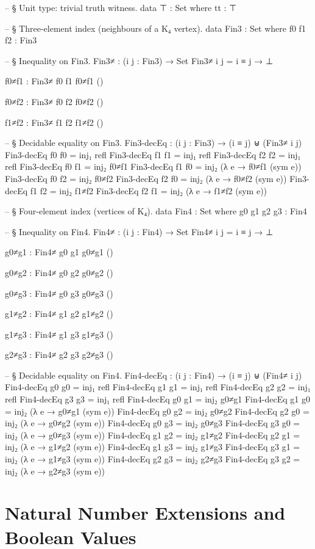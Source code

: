 \documentclass[11pt,a4paper]{book}
\begin{document}
\begin{code}
-- § Unit type: trivial truth witness.
data ⊤ : Set where
  tt : ⊤

-- § Three-element index (neighbours of a K₄ vertex).
data Fin3 : Set where
  f0 f1 f2 : Fin3

-- § Inequality on Fin3.
Fin3≠ : (i j : Fin3) → Set
Fin3≠ i j = i ≡ j → ⊥

f0≠f1 : Fin3≠ f0 f1
f0≠f1 ()

f0≠f2 : Fin3≠ f0 f2
f0≠f2 ()

f1≠f2 : Fin3≠ f1 f2
f1≠f2 ()

-- § Decidable equality on Fin3.
Fin3-decEq : (i j : Fin3) → (i ≡ j) ⊎ (Fin3≠ i j)
Fin3-decEq f0 f0 = inj₁ refl
Fin3-decEq f1 f1 = inj₁ refl
Fin3-decEq f2 f2 = inj₁ refl
Fin3-decEq f0 f1 = inj₂ f0≠f1
Fin3-decEq f1 f0 = inj₂ (λ e → f0≠f1 (sym e))
Fin3-decEq f0 f2 = inj₂ f0≠f2
Fin3-decEq f2 f0 = inj₂ (λ e → f0≠f2 (sym e))
Fin3-decEq f1 f2 = inj₂ f1≠f2
Fin3-decEq f2 f1 = inj₂ (λ e → f1≠f2 (sym e))

-- § Four-element index (vertices of K₄).
data Fin4 : Set where
  g0 g1 g2 g3 : Fin4

-- § Inequality on Fin4.
Fin4≠ : (i j : Fin4) → Set
Fin4≠ i j = i ≡ j → ⊥

g0≠g1 : Fin4≠ g0 g1
g0≠g1 ()

g0≠g2 : Fin4≠ g0 g2
g0≠g2 ()

g0≠g3 : Fin4≠ g0 g3
g0≠g3 ()

g1≠g2 : Fin4≠ g1 g2
g1≠g2 ()

g1≠g3 : Fin4≠ g1 g3
g1≠g3 ()

g2≠g3 : Fin4≠ g2 g3
g2≠g3 ()

-- § Decidable equality on Fin4.
Fin4-decEq : (i j : Fin4) → (i ≡ j) ⊎ (Fin4≠ i j)
Fin4-decEq g0 g0 = inj₁ refl
Fin4-decEq g1 g1 = inj₁ refl
Fin4-decEq g2 g2 = inj₁ refl
Fin4-decEq g3 g3 = inj₁ refl
Fin4-decEq g0 g1 = inj₂ g0≠g1
Fin4-decEq g1 g0 = inj₂ (λ e → g0≠g1 (sym e))
Fin4-decEq g0 g2 = inj₂ g0≠g2
Fin4-decEq g2 g0 = inj₂ (λ e → g0≠g2 (sym e))
Fin4-decEq g0 g3 = inj₂ g0≠g3
Fin4-decEq g3 g0 = inj₂ (λ e → g0≠g3 (sym e))
Fin4-decEq g1 g2 = inj₂ g1≠g2
Fin4-decEq g2 g1 = inj₂ (λ e → g1≠g2 (sym e))
Fin4-decEq g1 g3 = inj₂ g1≠g3
Fin4-decEq g3 g1 = inj₂ (λ e → g1≠g3 (sym e))
Fin4-decEq g2 g3 = inj₂ g2≠g3
Fin4-decEq g3 g2 = inj₂ (λ e → g2≠g3 (sym e))
\end{code}

\section{Natural Number Extensions and Boolean Values}
\end{document}
